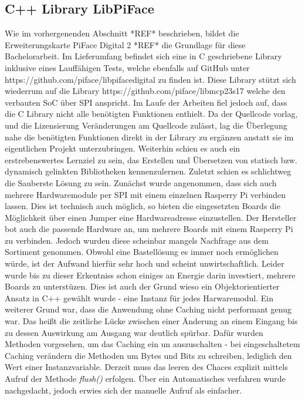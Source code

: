 \subsection{C++ Library LibPiFace}
Wie im vorhergenenden Abschnitt *REF* beschrieben, bildet die Erweiterungskarte PiFace Digital 2 *REF* die Grundlage für diese Bachelorarbeit. Im Lieferumfang befindet sich eine in C geschriebene Library inklusive eines Lauffähigen Tests, welche ebenfalls auf GitHub unter https://github.com/piface/libpifacedigital zu finden ist. Diese Library stützt sich wiederrum auf die Library https://github.com/piface/libmcp23s17 welche den verbauten SoC über SPI anspricht. Im Laufe der Arbeiten fiel jedoch auf, dass die C Library nicht alle benötigten Funktionen enthielt. Da der Quellcode vorlag, und die Lizensierung Veränderungen am Quellcode zulässt, lag die Überlegung nahe die benötigten Funktionen direkt in der Library zu ergänzen anstatt sie im eigentlichen Projekt unterzubringen. Weiterhin schien es auch ein erstrebenswertes Lernziel zu sein, das Erstellen und Übersetzen von statisch bzw. dynamisch gelinkten Bibliotheken kennenzulernen. Zuletzt schien es schlichtweg die Sauberste Lösung zu sein. Zunächst wurde angenommen, dass sich auch mehrere Hardwaremodule per SPI mit einem einzelnen Rasperry Pi verbinden lassen. Dies ist technisch auch möglich, so bieten die eingesetzten Boards die Möglichkeit über einen Jumper eine Hardwareadresse einzustellen. Der Hersteller bot auch die passende Hardware an, um mehrere Boards mit einem Rasperry Pi zu verbinden. Jedoch wurden diese scheinbar mangels Nachfrage aus dem Sortiment genommen. Obwohl eine Bastellösung es immer noch ermöglichen würde, ist der Aufwand hierfür sehr hoch und scheint unwirtschaftlich. Leider wurde bis zu dieser Erkentniss schon einiges an Energie darin investiert, mehrere Boards zu unterstüzen. Dies ist auch der Grund wieso ein Objektorientierter Ansatz in C++ gewählt wurde - eine Instanz für jedes Harwaremodul. Ein weiterer Grund war, dass die Anwendung ohne Caching nicht performant genug war. Das heißt die zeitliche Lücke zwischen einer Änderung an einem Eingang bis zu dessen Auswirkung am Ausgang war deutlich spürbar. Dafür wurden Methoden vorgesehen, um das Caching ein un auszuschalten - bei eingeschaltetem Caching verändern die Methoden um Bytes und Bits zu schreiben, lediglich den Wert einer Instanzvariable. Derzeit muss das leeren des Chaces explizit mittels Aufruf der Methode \textit{flush()} erfolgen. Über ein Automatisches verfahren wurde nachgedacht, jedoch erwies sich der manuelle Aufruf als einfacher. 

